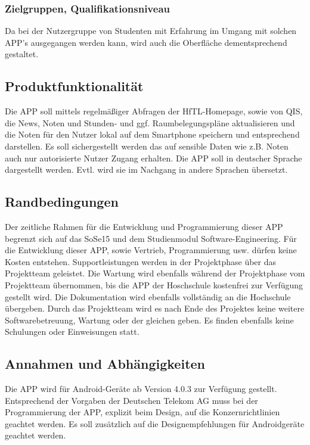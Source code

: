 \subsubsection{Zielgruppen, Qualifikationsniveau}

Da bei der Nutzergruppe von Studenten mit Erfahrung im Umgang mit solchen APP's ausgegangen werden kann, wird auch die Oberfläche dementsprechend gestaltet.

\subsection{\textbf{Produktfunktionalität}}

Die APP soll mittels regelmäßiger Abfragen der \acs{HfTL}-Homepage, sowie von \acs{QIS}, die News, Noten und Stunden- und ggf. Raumbelegungspläne aktualisieren und die Noten für den Nutzer lokal auf dem Smartphone speichern und entsprechend darstellen. 
Es soll sichergestellt werden das auf sensible Daten wie z.B. Noten auch nur autorisierte Nutzer Zugang erhalten. Die APP soll in deutscher Sprache dargestellt werden. Evtl. wird sie im Nachgang in andere Sprachen übersetzt. 

\subsection{\textbf{Randbedingungen}}

Der zeitliche Rahmen für die Entwicklung und Programmierung dieser APP begrenzt sich auf das \ac{SoSe15} und dem Studienmodul Software-Engineering.
Für die Entwicklung dieser APP, sowie Vertrieb, Programmierung usw. dürfen keine Kosten entstehen.
Supportleistungen werden in der Projektphase über das Projektteam geleistet. Die Wartung wird ebenfalls während der Projektphase vom Projektteam übernommen, bis die APP der Hoschschule  kostenfrei zur Verfügung gestellt wird. Die Dokumentation wird ebenfalls vollständig an die Hochschule übergeben.
Durch das Projektteam wird es nach Ende des Projektes keine weitere Softwarebetreuung, Wartung oder der gleichen geben. Es finden ebenfalls keine Schulungen oder Einweisungen statt.

\subsection{\textbf{Annahmen und Abhängigkeiten}}

Die APP wird für Android-Geräte ab Version 4.0.3 zur Verfügung gestellt.
Entsprechend der Vorgaben der Deutschen Telekom AG muss bei der Programmierung der APP, explizit beim Design, auf die Konzernrichtlinien geachtet werden. Es soll zusätzlich auf die Designempfehlungen für Androidgeräte geachtet werden.

